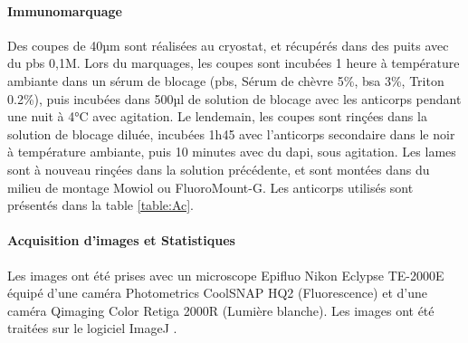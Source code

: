 \paragraph{Immunomarquage}	
\label{sec:immunomarquage}
	Des coupes de 40µm sont réalisées au cryostat, et récupérés dans des puits avec du \acrshort{pbs} 0,1M. Lors du marquages, les coupes sont incubées 1 heure à température ambiante dans un sérum de blocage (\acrshort{pbs}, Sérum de chèvre 5\%, \acrshort{bsa} 3\%, Triton 0.2\%), puis  incubées dans 500µl de solution de blocage avec les anticorps pendant une nuit à 4°C avec agitation. Le lendemain, les coupes sont rinçées dans la solution de blocage diluée, incubées 1h45 avec l'anticorps secondaire dans le noir à température ambiante, puis 10 minutes avec du \gls{dapi}, sous agitation. Les lames sont à nouveau rinçées dans la solution précédente, et sont montées dans du milieu de montage Mowiol ou FluoroMount-G.
	Les anticorps utilisés sont présentés dans la table \ref{table:Ac}.
	
\begin{table}
\end{table}
	
\paragraph{Acquisition d'images et Statistiques}
\label{sec:ImagesStats}
	Les images ont été prises avec un microscope Epifluo Nikon Eclypse TE-2000E équipé d'une caméra Photometrics CoolSNAP HQ2 (Fluorescence) et d'une caméra Qimaging Color Retiga 2000R (Lumière blanche).
	Les images ont été traitées sur le logiciel ImageJ \cite{Schneider2012}.